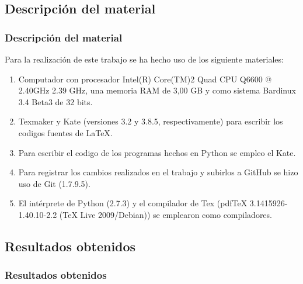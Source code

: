 \documentclass{beamer}
\begin{document}
\subsection{Descripción del material}
\begin{frame}
\frametitle{Descripción del material}
	Para la realización de este trabajo se ha hecho uso de los siguiente materiales:
	
  \begin{enumerate}
    \item
    Computador con procesador Intel(R) Core(TM)2 Quad CPU Q6600 @ 2.40GHz 2.39 GHz, 
una memoria RAM de 3,00 GB y como sistema Bardinux 3.4 Beta3 de 32 bits.
      \pause
    \item
    Texmaker y Kate (versiones 3.2 y 3.8.5, respectivamente) para escribir los codigos fuentes de LaTeX.
      \pause
    \item
    Para escribir el codigo de los programas hechos en Python se empleo el Kate.
      \pause
    \item 
    Para registrar los cambios realizados en el trabajo y subirlos a GitHub se hizo uso de Git (1.7.9.5).
      \pause
    \item
    El intérprete de Python (2.7.3) y el compilador de Tex (pdfTeX 3.1415926-1.40.10-2.2 (TeX Live 2009/Debian)) se emplearon como compiladores.   
  \end{enumerate}


\end{frame}

\subsection{Resultados obtenidos}
\begin{frame}
\frametitle{Resultados obtenidos}



\end{frame}
\end{document}
